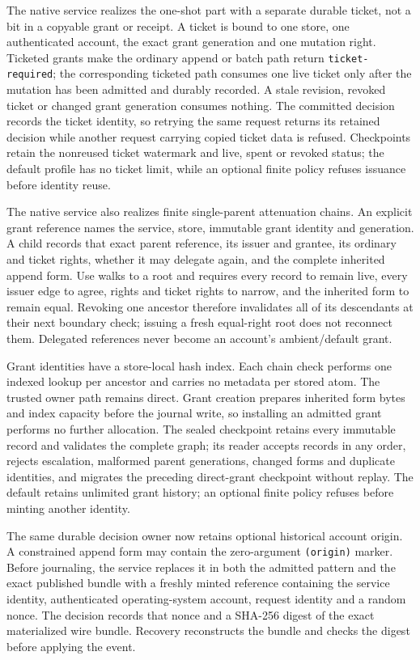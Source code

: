 \documentclass[11pt]{article}
\theoremstyle{definition}
\theoremstyle{remark}
\begin{document}
The native service realizes the one-shot part with a separate durable ticket,
not a bit in a copyable grant or receipt.  A ticket is bound to one store, one
authenticated account, the exact grant generation and one mutation right.
Ticketed grants make the ordinary append or batch path return
\texttt{ticket-required}; the corresponding ticketed path consumes one live
ticket only after the mutation has been admitted and durably recorded.  A
stale revision, revoked ticket or changed grant generation consumes nothing.
The committed decision records the ticket identity, so retrying the same
request returns its retained decision while another request carrying copied
ticket data is refused.  Checkpoints retain the nonreused ticket watermark and
live, spent or revoked status; the default profile has no ticket limit, while
an optional finite policy refuses issuance before identity reuse.

The native service also realizes finite single-parent attenuation chains.
An explicit grant reference names the service, store, immutable grant identity
and generation.  A child records that exact parent reference, its issuer and
grantee, its ordinary and ticket rights, whether it may delegate again, and
the complete inherited append form.  Use walks to a root and requires every
record to remain live, every issuer edge to agree, rights and ticket rights to
narrow, and the inherited form to remain equal.  Revoking one ancestor
therefore invalidates all of its descendants at their next boundary check;
issuing a fresh equal-right root does not reconnect them.  Delegated references
never become an account's ambient/default grant.

Grant identities have a store-local hash index.  Each chain check performs one
indexed lookup per ancestor and carries no metadata per stored atom.  The
trusted owner path remains direct.  Grant creation prepares inherited form
bytes and index capacity before the journal write, so installing an admitted
grant performs no further allocation.  The sealed checkpoint retains every
immutable record and validates the complete graph; its reader accepts records
in any order, rejects escalation, malformed parent generations, changed forms
and duplicate identities, and migrates the preceding direct-grant checkpoint
without replay.  The default retains unlimited grant history; an optional
finite policy refuses before minting another identity.

The same durable decision owner now retains optional historical account
origin.  A constrained append form may contain the zero-argument
\texttt{(origin)} marker.  Before journaling, the service replaces it in both
the admitted pattern and the exact published bundle with a freshly minted
reference containing the service identity, authenticated operating-system
account, request identity and a random nonce.  The decision records that nonce
and a SHA-256 digest of the exact materialized wire bundle.  Recovery
reconstructs the bundle and checks the digest before applying the event.
\end{document}
